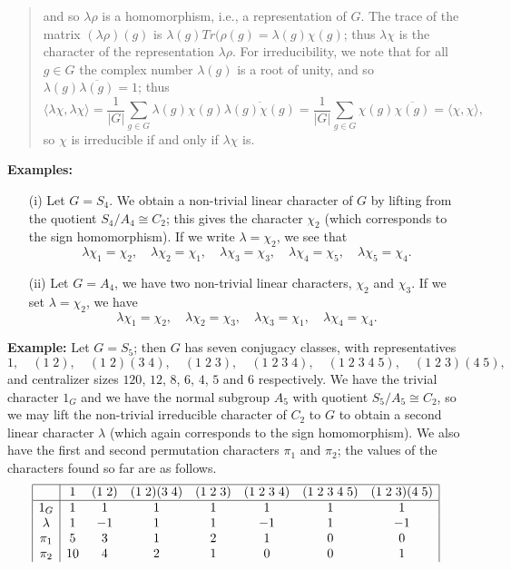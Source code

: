 {\begin{quote}
 and so $\lambda\rho$ is a homomorphism, i.e., a
representation of $G$. The trace
of the matrix $(\lambda\rho)(g)$ is $\lambda(g)Tr(\rho(g)=\lambda(g)\chi(g)$;
thus $\lambda\chi$ is the character of the representation $\lambda\rho$. For
irreducibility, we note that for all $g\in G$ the complex number
$\lambda(g)$ is a root of unity, and so
$\lambda(g)\overline{\lambda(g)}=1$; thus
$$\langle\lambda\chi,\lambda\chi\rangle
=\frac{1}{|G|}\sum_{g\in G}\lambda(g)\chi(g)\overline{\lambda(g)\chi(g)}
=\frac{1}{|G|}\sum_{g\in G}\chi(g)\overline{\chi(g)}
=\langle\chi,\chi\rangle,$$
so $\chi$ is irreducible if and only if $\lambda\chi$ is.
\end{quote}
{\bf Examples:}
\begin{itemize}
\item[(i)] Let $G=S_4$. We
obtain a non-trivial linear character of $G$ by lifting from the quotient
$S_4/A_4\cong C_2$; this gives the character $\chi_2$ (which corresponds to
the sign homomorphism). If we write $\lambda=\chi_2$, we see that
$$\lambda\chi_1=\chi_2,\quad\lambda\chi_2=\chi_1,\quad
\lambda\chi_3=\chi_3,\quad\lambda\chi_4=\chi_5,\quad
\lambda\chi_5=\chi_4.$$
\item[(ii)] Let $G=A_4$, we have two non-trivial linear characters,
$\chi_2$ and $\chi_3$. If we set $\lambda=\chi_2$, we have
$$\lambda\chi_1=\chi_2,\quad\lambda\chi_2=\chi_3,\quad
\lambda\chi_3=\chi_1,\quad\lambda\chi_4=\chi_4.$$
\end{itemize}
{\bf Example:} Let $G=S_5$; then $G$ has seven conjugacy classes,
with representatives
$$1,\quad(1\;2),\quad(1\;2)(3\;4),\quad(1\;2\;3),\quad(1\;2\;3\;4),
\quad(1\;2\;3\;4\;5),\quad(1\;2\;3)(4\;5),$$
and centralizer sizes $120$, $12$, $8$, $6$, $4$, $5$ and
$6$ respectively. We have the trivial character $1_G$ and
we have the normal subgroup $A_5$ with quotient $S_5/A_5 \cong C_2$, so we may
lift the non-trivial irreducible character of $C_2$ to $G$ to obtain a second
linear character $\lambda$ (which again corresponds to the sign homomorphism).
We also have the first and second permutation characters $\pi_1$ and $\pi_2$;
the values of the characters found so far are as follows.
$$
\begin{array}{|c|ccccccc|}
\hline
&1&(1\;2)&(1\;2)(3\;4)&(1\;2\;3)&(1\;2\;3\;4)&(1\;2\;3\;4\;5)&(1\;2\;3)(4\;5)\\
\hline
1_G&1&1&1&1&1&1&1\\
\lambda&1&-1&1&1&-1&1&-1\\
\pi_1&5&3&1&2&1&0&0\\
\pi_2&10&4&2&1&0&0&1\\

\end{array}$$}
